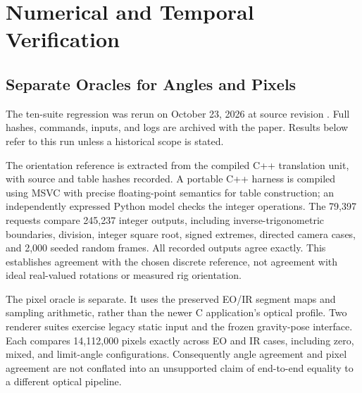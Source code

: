 \section{Numerical and Temporal Verification}
\label{sec:verification}
\subsection{Separate Oracles for Angles and Pixels}
The ten-suite regression was rerun on October 23, 2026 at source revision
. Full hashes, commands, inputs, and logs are archived with the
paper. Results below refer to this run unless a historical scope is stated.

The orientation reference is extracted from the compiled C++ translation
unit, with source and table hashes recorded. A portable C++ harness is
compiled using MSVC with precise floating-point semantics for table
construction; an independently expressed Python model checks the integer
operations. The 79,397 requests compare 245,237 integer outputs, including
inverse-trigonometric boundaries, division, integer square root, signed
extremes, directed camera cases, and 2,000 seeded random frames. All recorded
outputs agree exactly. This establishes agreement with the chosen discrete
reference, not agreement with ideal real-valued rotations or measured rig
orientation.

The pixel oracle is separate. It uses the preserved EO/IR segment maps and
sampling arithmetic, rather than the newer C application's optical profile.
Two renderer suites exercise legacy static input and the frozen gravity-pose
interface. Each compares 14,112,000 pixels exactly across EO and IR cases,
including zero, mixed, and limit-angle configurations. Consequently angle
agreement and pixel agreement are not conflated into an unsupported claim
of end-to-end equality to a different optical pipeline.

